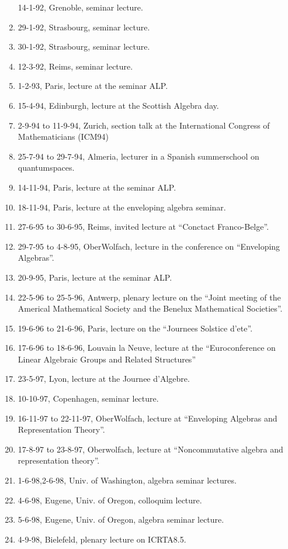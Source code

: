 \documentclass{amsart}
\begin{document}
\begin{enumerate}
14-1-92, Grenoble, seminar lecture.
\item
29-1-92, Strasbourg, seminar lecture.
\item
30-1-92, Strasbourg, seminar lecture.
\item
12-3-92, Reims, seminar lecture.
\item
1-2-93, Paris, lecture at the seminar ALP.
\item
15-4-94, Edinburgh, lecture at the Scottish Algebra day.
\item
2-9-94 to 11-9-94, Zurich, section talk at the International Congress
of Mathematicians (ICM94)
\item
25-7-94 to 29-7-94, Almeria, lecturer in a Spanish summerschool on
quantumspaces.
\item
14-11-94, Paris, lecture at the seminar ALP.
\item
18-11-94, Paris, lecture at the enveloping algebra seminar.
\item 
27-6-95 to 30-6-95, Reims, invited lecture at ``Conctact
Franco-Belge''.
\item
29-7-95 to 4-8-95, OberWolfach, lecture in the conference on
``Enveloping Algebras''.
\item
20-9-95, Paris, lecture at the seminar ALP.
\item 22-5-96 to 25-5-96, Antwerp, plenary lecture on the ``Joint
  meeting of the Americal Mathematical Society and the Benelux
  Mathematical Societies''.
\item
19-6-96 to 21-6-96, Paris, lecture on the ``Journees Solstice d'ete''.
\item
17-6-96 to 18-6-96, Louvain la Neuve, lecture at the
``Euroconference on Linear Algebraic Groups and Related Structures''
\item 
23-5-97, Lyon, lecture at the Journee d'Algebre.
\item
10-10-97, Copenhagen, seminar lecture.
\item
16-11-97 to 22-11-97, OberWolfach, lecture at ``Enveloping
Algebras and Representation Theory''. 
\item
17-8-97 to 23-8-97, Oberwolfach, lecture at ``Noncommutative
algebra and representation theory''.
\item 
1-6-98,2-6-98, Univ. of Washington, algebra seminar lectures.
\item
4-6-98, Eugene, Univ. of Oregon, colloquim lecture.
\item
5-6-98, Eugene, Univ. of Oregon, algebra seminar lecture.
\item
4-9-98, Bielefeld, plenary lecture on ICRTA8.5.

\end{enumerate}
\end{document}
